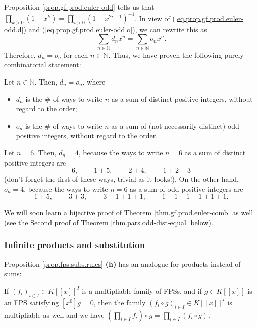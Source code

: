 Proposition \ref{prop.gf.prod.euler-odd} tells us that $\prod_{k>0}\left(
1+x^{k}\right)  =\prod_{i>0}\left(  1-x^{2i-1}\right)  ^{-1}$. In view of
(\ref{eq.prop.gf.prod.euler-odd.d}) and (\ref{eq.prop.gf.prod.euler-odd.o}),
we can rewrite this as
\[
\sum_{n\in\mathbb{N}}d_{n}x^{n}=\sum_{n\in\mathbb{N}}o_{n}x^{n}.
\]
Therefore, $d_{n}=o_{n}$ for each $n\in\mathbb{N}$. Thus, we have proven the
following purely combinatorial statement:

\begin{theorem}
[Euler]\label{thm.gf.prod.euler-comb}Let $n\in\mathbb{N}$. Then, $d_{n}=o_{n}%
$, where

\begin{itemize}
\item $d_{n}$ is the \# of ways to write $n$ as a sum of distinct positive
integers, without regard to the order;

\item $o_{n}$ is the \# of ways to write $n$ as a sum of (not necessarily
distinct) odd positive integers, without regard to the order.
\end{itemize}
\end{theorem}

\begin{example}
Let $n=6$. Then, $d_{n}=4$, because the ways to write $n=6$ as a sum of
distinct positive integers are%
\[
6,\ \ \ \ \ \ \ \ \ \ 1+5,\ \ \ \ \ \ \ \ \ \ 2+4,\ \ \ \ \ \ \ \ \ \ 1+2+3
\]
(don't forget the first of these ways, trivial as it looks!). On the other
hand, $o_{n}=4$, because the ways to write $n=6$ as a sum of odd positive
integers are%
\[
1+5,\ \ \ \ \ \ \ \ \ \ 3+3,\ \ \ \ \ \ \ \ \ \ 3+1+1+1,\ \ \ \ \ \ \ \ \ \ 1+1+1+1+1+1.
\]

\end{example}

We will soon learn a bijective proof of Theorem \ref{thm.gf.prod.euler-comb}
as well (see the Second proof of Theorem \ref{thm.pars.odd-dist-equal} below).

\subsubsection{Infinite products and substitution}

Proposition \ref{prop.fps.subs.rules} \textbf{(h)} has an analogue for
products instead of sums:

\begin{proposition}
\label{prop.fps.subs.rule-infprod}If $\left(  f_{i}\right)  _{i\in I}\in
K\left[  \left[  x\right]  \right]  ^{I}$ is a multipliable family of FPSs,
and if $g\in K\left[  \left[  x\right]  \right]  $ is an FPS satisfying
$\left[  x^{0}\right]  g=0$, then the family $\left(  f_{i}\circ g\right)
_{i\in I}\in K\left[  \left[  x\right]  \right]  ^{I}$ is multipliable as well
and we have $\left(  \prod_{i\in I}f_{i}\right)  \circ g=\prod_{i\in I}\left(
f_{i}\circ g\right)  $.
\end{proposition}

